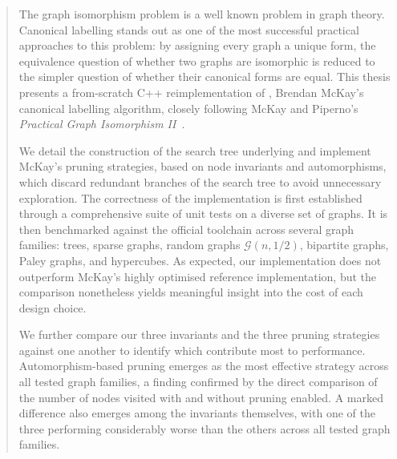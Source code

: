 \begin{abstract}
    The graph isomorphism problem is a well known problem in graph theory. Canonical labelling stands out as one of the most successful practical approaches to this problem: by assigning every graph a unique form, the equivalence question of whether two graphs are isomorphic is reduced to the simpler question of whether their canonical forms are equal. This thesis presents a from-scratch C++ reimplementation of \Naut{}, Brendan McKay's canonical labelling algorithm, closely following McKay and Piperno's \emph{Practical Graph Isomorphism II}~\cite{mckay2014practical}.

    We detail the construction of the search tree underlying \Naut{} and implement McKay's pruning strategies, based on node invariants and automorphisms, which discard redundant branches of the search tree to avoid unnecessary exploration. The correctness of the implementation is first established through a comprehensive suite of unit tests on a diverse set of graphs. It is then benchmarked against the official \Naut{} toolchain across several graph families: trees, sparse graphs, random graphs $\mathcal{G}(n,1/2)$, bipartite graphs, Paley graphs, and hypercubes. As expected, our implementation does not outperform McKay's highly optimised reference implementation, but the comparison nonetheless yields meaningful insight into the cost of each design choice.


    We further compare our three invariants and the three pruning strategies against one another to identify which contribute most to performance. Automorphism-based pruning emerges as the most effective strategy across all tested graph families, a finding confirmed by the direct comparison of the number of nodes visited with and without pruning enabled. A marked difference also emerges among the invariants themselves, with one of the three performing considerably worse than the others across all tested graph families.
\end{abstract}